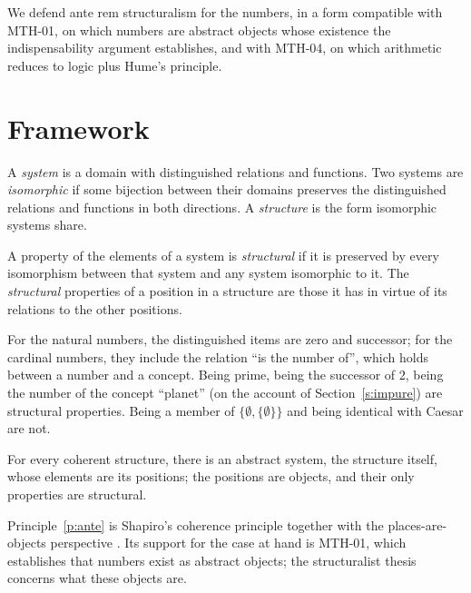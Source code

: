 \documentclass{situationist-preprint}
\begin{document}
We defend ante rem structuralism for the numbers, in a form compatible with MTH-01, on which numbers are abstract objects whose existence the indispensability argument establishes, and with MTH-04, on which arithmetic reduces to logic plus Hume's principle.

\section{Framework}

\begin{definition}\label{d:system}
A \emph{system} is a domain with distinguished relations and functions. Two systems are \emph{isomorphic} if some bijection between their domains preserves the distinguished relations and functions in both directions. A \emph{structure} is the form isomorphic systems share.
\end{definition}

\begin{definition}\label{d:struct}
A property of the elements of a system is \emph{structural} if it is preserved by every isomorphism between that system and any system isomorphic to it. The \emph{structural} properties of a position in a structure are those it has in virtue of its relations to the other positions.
\end{definition}

For the natural numbers, the distinguished items are zero and successor; for the cardinal numbers, they include the relation \enquote{is the number of}, which holds between a number and a concept. Being prime, being the successor of $2$, being the number of the concept \enquote{planet} (on the account of Section~\ref{s:impure}) are structural properties. Being a member of $\{\emptyset, \{\emptyset\}\}$ and being identical with Caesar are not.

\begin{principle}\label{p:ante}
For every coherent structure, there is an abstract system, the structure itself, whose elements are its positions; the positions are objects, and their only properties are structural.
\end{principle}

Principle~\ref{p:ante} is Shapiro's coherence principle together with the places-are-objects perspective \citep[ch.~3--4]{Shapiro1997}. Its support for the case at hand is MTH-01, which establishes that numbers exist as abstract objects; the structuralist thesis concerns what these objects are.
\end{document}
